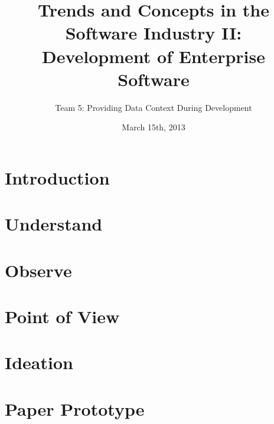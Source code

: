 \documentclass[runningheads]{llncs}
\begin{document}
    \mainmatter
    \title{Trends and Concepts in the Software Industry II: \\ Development of Enterprise Software}
    \author{Team 5: Providing Data Context During Development}
    \date{March 15th, 2013}
    \maketitle

\newpage


\section{Introduction} %

\section{Understand}

\section{Observe}

\section{Point of View}

\section{Ideation}

\section{Paper Prototype}
\end{document}
